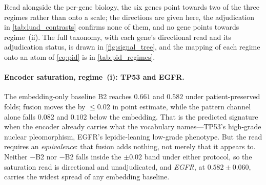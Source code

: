 Read alongside the per-gene biology, the six genes point towards two of
the three regimes rather than onto a scale; the directions are given
here, the adjudication in \cref{tab:luad_contrasts} confirms none of
them, and no gene points towards regime~(ii).
The full taxonomy, with each gene's directional read and its
adjudication status, is drawn in \cref{fig:signal_tree}, and the
mapping of each regime onto an atom of \cref{eq:pid} is in
\cref{tab:pid_regimes}.

\paragraph{Encoder saturation, regime~(i): TP53 and EGFR.}
The embedding-only baseline B2 reaches $0.661$ and $0.582$ under
patient-preserved folds; fusion moves the \auroc{} by $\leq0.02$ in
point estimate, while the pattern channel alone falls $0.082$ and
$0.102$ below the embedding. That is the predicted signature when the
encoder already carries what the vocabulary names---TP53's high-grade
nuclear pleomorphism, EGFR's lepidic-leaning low-grade phenotype. But
the read requires an \emph{equivalence}: that fusion adds nothing, not
merely that it appears to. Neither \piabmil{}$-$B2 nor \fcmil{}$-$B2
falls inside the $\pm0.02$ band under either protocol, so the saturation
read is directional and unadjudicated, and \textit{EGFR}, at
$0.582\pm0.060$, carries the widest spread of any embedding baseline.

